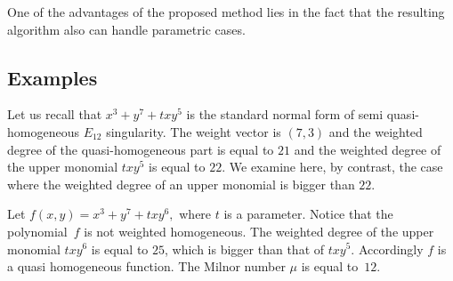 \documentclass[pdftex]{sigma}%
\numberwithin{equation}{section}
\begin{document}
One of the advantages of the proposed method lies in the fact that the resulting algorithm also can handle parametric cases.

\subsection{Examples}

Let us recall that $ x^3+y^7+txy^5 $ is the standard normal form of semi quasi-homogeneous $E_{12}$ singularity. The weight vector is $(7,3)$ and the weighted degree of the quasi-homogeneous part is equal to $21$ and the weighted degree of the upper monomial $ txy^5 $ is equal to $22$. We examine here, by contrast, the case where the weighted degree of an upper monomial is bigger than $ 22.$

\begin{Example}
Let $ f(x,y)=x^3+y^7+txy^6, $ where $t$ is a parameter. Notice that the polyno\-mial~$f$ is not weighted homogeneous. The weighted degree of the upper monomial $ txy^6 $ is equal to $25$, which is bigger than that of $ txy^5$. Accordingly $f$ is a quasi homogeneous function. The Milnor number $\mu$ is equal to~$12$.


\end{Example}
\end{document}
